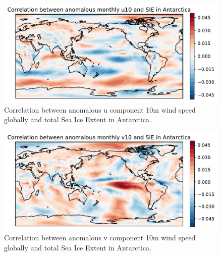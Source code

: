 \begin{figure}[H]
    \centering
    \includegraphics[width=\textwidth]{Images/global_correlation_anomalous_monthly_u10_sie.pdf}
    \caption{Correlation between anomalous u component 10m wind speed globally and total Sea Ice Extent in Antarctica.}
    \label{fig:u10_anomalous_sie_corr}
\end{figure}
\begin{figure}[H]
    \centering
    \includegraphics[width=\textwidth]{Images/global_correlation_anomalous_monthly_v10_sie.pdf}
    \caption{Correlation between anomalous v component 10m wind speed globally and total Sea Ice Extent in Antarctica.}
    \label{fig:v10_anomalous_sie_corr}
\end{figure}